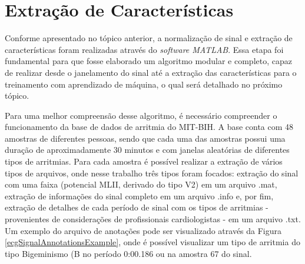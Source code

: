 \documentclass[conference]{IEEEtran}
\begin{document}

\section{Extração de Características}

Conforme apresentado no tópico anterior, a normalização de sinal e extração de características foram realizadas através do \textit{software MATLAB}. Essa etapa foi fundamental para que fosse elaborado um algoritmo modular e completo, capaz de realizar desde o janelamento do sinal até a extração das características para o treinamento com aprendizado de máquina, o qual será detalhado no próximo tópico.

Para uma melhor compreensão desse algoritmo, é necessário compreender o funcionamento da base de dados de arritmia do MIT-BIH. A base conta com 48 amostras de diferentes pessoas, sendo que cada uma das amostras possui uma duração de aproximadamente 30 minutos e com janelas aleatórias de diferentes tipos de arritmias. Para cada amostra é possível realizar a extração de vários tipos de arquivos, onde nesse trabalho três tipos foram focados: extração do sinal com uma faixa (potencial MLII, derivado do tipo V2) em um arquivo .mat, extração de informações do sinal completo em um arquivo .info e, por fim, extração de detalhes de cada período de sinal com os tipos de arritmias - provenientes de considerações de profissionais cardiologistas - em um arquivo .txt. Um exemplo do arquivo de anotações pode ser visualizado através da Figura \ref{ecgSignalAnnotationsExample}, onde é possível visualizar um tipo de arritmia do tipo Bigeminismo (B no período 0:00.186 ou na amostra 67 do sinal.
\end{document}
